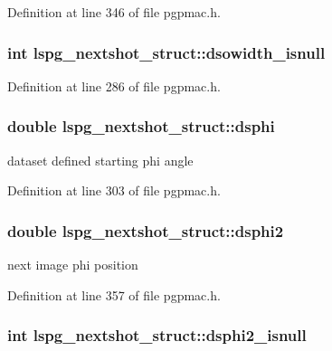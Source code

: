 Definition at line 346 of file pgpmac.\-h.

\hypertarget{structlspg__nextshot__struct_a5dd3db64790e09bc03499e521bbaa126}{
\subsubsection[{dsowidth\-\_\-isnull}]{\setlength{\rightskip}{0pt plus 5cm}int lspg\-\_\-nextshot\-\_\-struct\-::dsowidth\-\_\-isnull}}\label{structlspg__nextshot__struct_a5dd3db64790e09bc03499e521bbaa126}


Definition at line 286 of file pgpmac.\-h.

\hypertarget{structlspg__nextshot__struct_a64ebde597ca97a3b98145dc2d580c64f}{
\subsubsection[{dsphi}]{\setlength{\rightskip}{0pt plus 5cm}double lspg\-\_\-nextshot\-\_\-struct\-::dsphi}}\label{structlspg__nextshot__struct_a64ebde597ca97a3b98145dc2d580c64f}


dataset defined starting phi angle 



Definition at line 303 of file pgpmac.\-h.

\hypertarget{structlspg__nextshot__struct_a98857616b6bbb6ba861e96b6b7551756}{
\subsubsection[{dsphi2}]{\setlength{\rightskip}{0pt plus 5cm}double lspg\-\_\-nextshot\-\_\-struct\-::dsphi2}}\label{structlspg__nextshot__struct_a98857616b6bbb6ba861e96b6b7551756}


next image phi position 



Definition at line 357 of file pgpmac.\-h.

\hypertarget{structlspg__nextshot__struct_a57a9c43be86188f65b96d59c2adec674}{
\subsubsection[{dsphi2\-\_\-isnull}]{\setlength{\rightskip}{0pt plus 5cm}int lspg\-\_\-nextshot\-\_\-struct\-::dsphi2\-\_\-isnull}}\label{structlspg__nextshot__struct_a57a9c43be86188f65b96d59c2adec674}


